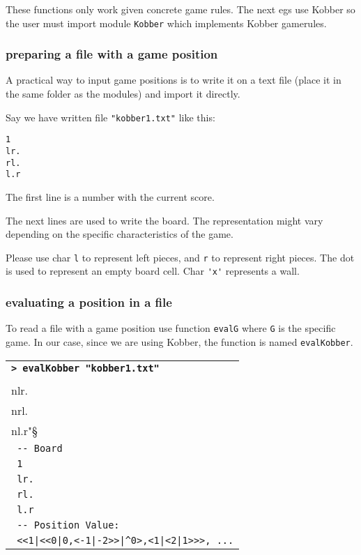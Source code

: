 \documentclass[a4paper,12pt]{article}
\newcommand{\bash}[1]{\small\textbf{\lstinline§> #1§}\\}
\newcommand{\out}[1]{\small\lstinline§ #1§}
\newcommand{\haskellCode}{\fontfamily{pcr}\selectfont}
\newenvironment{sgcode}
	{ \haskellCode
	  \begin{tabular}{|p{0.9\textwidth}|}
      \hline	
	}
	{ \\\hline  
      \end{tabular} \\
	  \par 
	}
\begin{document}
These functions only work given concrete game rules. The next egs use Kobber so the user 
must import module \verb!Kobber! which implements Kobber gamerules.

\subsubsection{preparing a file with a game position}

A practical way to input game positions is to write it on a text file (place it in the same folder
as the modules) and import it directly.

Say we have written file \verb|"kobber1.txt"| like this:

\begin{verbatim}
1
lr.
rl.
l.r
\end{verbatim}

The first line is a number with the current score.

The next lines are used to write the board. The representation might vary depending on the 
specific characteristics of the game.

Please use char \verb!l! to represent left pieces, and \verb!r! to represent right 
pieces. The dot is used to represent an empty board cell. Char \verb!'x'! represents a wall.

\subsubsection{evaluating a position in a file}

To read a file with a game position use function \verb!evalG! where \verb!G! is the specific game. In our case, since
we are using Kobber, the function is named \verb!evalKobber!.

\begin{sgcode}
\bash{evalKobber "kobber1.txt"}
\out{-- Read: "1\\nlr.\\nrl.\\nl.r"} \\
\out{-- Board} \\
\out{1} \\
\out{lr.} \\
\out{rl.} \\
\out{l.r} \\
\out{-- Position Value:} \\
\out{<<1|<<0|0,<-1|-2>>|^0>,<1|<2|1>>>, ...} 
\end{sgcode}
\end{document}
